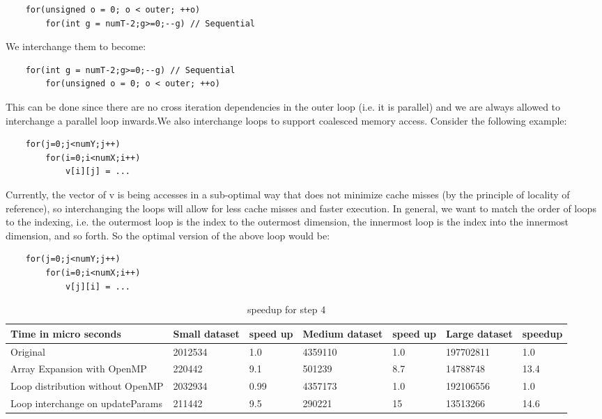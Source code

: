 \documentclass{article}
\begin{document}
\begin{verbatim}
    for(unsigned o = 0; o < outer; ++o)
        for(int g = numT-2;g>=0;--g) // Sequential
\end{verbatim}
We interchange them to become:
\begin{verbatim}
    for(int g = numT-2;g>=0;--g) // Sequential
        for(unsigned o = 0; o < outer; ++o)
\end{verbatim}
This can be done since there are no cross iteration dependencies in the outer loop (i.e. it is
parallel) and we are always allowed to interchange a parallel loop inwards.We also interchange loops to support coalesced memory access. Consider the following example:
\begin{verbatim}
    for(j=0;j<numY;j++)
        for(i=0;i<numX;i++)
            v[i][j] = ...
\end{verbatim}
Currently, the vector of v is being accesses in a sub-optimal way that does not minimize cache misses
(by the principle of locality of reference), so interchanging the loops will allow for less cache
misses and faster execution. In general, we want to match the order of loops to the indexing, i.e. the
outermost loop is the index to the outermost dimension, the innermost loop is the index into
the innermost dimension, and so forth.
So the optimal version of the above loop would be:
\begin{verbatim}
    for(j=0;j<numY;j++)
        for(i=0;i<numX;i++)
            v[j][i] = ...
\end{verbatim}
\begin{table}[ht]
\centering
\caption{speedup for step 4}
\label{my-label5}
\begin{tabular}{|l|l|l|l|l|l|l|}
\hline
Time in micro seconds& Small dataset & speed up & Medium dataset & speed up & Large dataset & speedup \\ \hline
Original       & 2012534       & 1.0      & 4359110        & 1.0      & 197702811     & 1.0     \\ \hline
Array Expansion with OpenMP    & 220442        & 9.1      & 501239         & 8.7      & 14788748      & 13.4    \\ \hline
Loop distribution without OpenMP & 2032934       & 0.99     & 4357173        & 1.0      & 192106556     & 1.0     \\ \hline
Loop interchange on updateParams   & 211442        & 9.5      & 290221         & 15       & 13513266      & 14.6    \\ \hline
\end{tabular}
\end{table}
\end{document}
